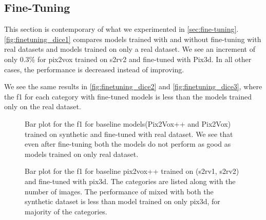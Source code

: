 \subsection{Fine-Tuning}\label{subsec:fine-tuning-dice}

This section is contemporary of what we experimented in \autoref{sec:fine-tuning}.
\autoref{fig:finetuning_dice1} compares models trained with and without fine-tuning with real datasets and models trained on only a real dataset.
We see an increment of only 0.3\% for pix2vox trained on \gls{s2rv2} and fine-tuned with Pix3d.
In all other cases, the performance is decreased instead of improving.

We see the same results in  \autoref{fig:finetuning_dice2} and \autoref{fig:finetuning_dice3},
where the \gls{f1} for each category with fine-tuned models is less than the models trained only on the real dataset.
%


\begin{figure}[ht]
    \centering
    \resizebox{0.75\textwidth}{!}{}
    \caption{Bar plot for the \gls{f1} for baseline models(Pix2Vox++ and Pix2Vox) trained on synthetic and fine-tuned with real dataset.
    We see that even after fine-tuning both the models do not perform as good as models trained on only real dataset.}
    \label{fig:finetuning_dice1}
\end{figure}

\begin{figure}
    \centering
    \resizebox{0.75\textwidth}{!}{}
    \caption{Bar plot for the \gls{f1} for baseline pix2vox++ trained on (\gls{s2rv1}, \gls{s2rv2}) and fine-tuned with pix3d.
    The categories are listed along with the number of images.
    The performance of  mixed with both the synthetic dataset is less than model trained on only pix3d, for majority of the categories.}
    \label{fig:finetuning_dice2}
\end{figure}

